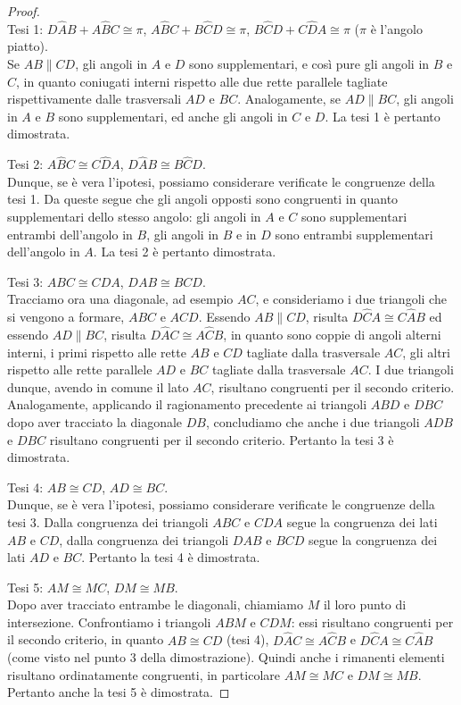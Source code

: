 \begin{proof}~\\
\indent Tesi 1: $D\widehat{A}B+A\widehat{B}C\cong\pi$, $A\widehat{B}C+B\widehat{C}D\cong\pi$, $B\widehat{C}D+C\widehat{D}A\cong\pi$ ($\pi$ è l'angolo piatto).\\
Se $AB\parallel CD$, gli angoli in $A$ e $D$ sono supplementari, e così pure gli angoli in $B$ e $C$, in quanto coniugati interni rispetto alle due rette parallele tagliate rispettivamente dalle trasversali $AD$ e $BC$. Analogamente, se $AD\parallel BC$, gli angoli in $A$ e $B$ sono supplementari, ed anche gli angoli in $C$ e $D$. La tesi 1 è pertanto dimostrata.

Tesi 2: $A\widehat{B}C\cong C\widehat{D}A$, $D\widehat{A}B\cong B\widehat{C}D$.\\
Dunque, se è vera l'ipotesi, possiamo considerare verificate le congruenze della tesi 1. Da queste segue che gli angoli opposti sono congruenti in quanto supplementari dello stesso angolo: gli angoli in $A$ e $C$ sono supplementari entrambi dell'angolo in $B$, gli angoli in $B$ e in $D$ sono entrambi supplementari dell'angolo in $A$. La tesi 2 è pertanto dimostrata.

Tesi 3: $ABC\cong CDA$, $DAB\cong BCD$.\\
Tracciamo ora una diagonale, ad esempio $AC$, e consideriamo i due triangoli che si vengono a formare, $ABC$ e $ACD$. Essendo $AB\parallel CD$, risulta $D\widehat{C}A\cong C\widehat{A}B$ ed essendo $AD\parallel BC$, risulta $D\widehat{A}C\cong A\widehat{C}B$, in quanto sono coppie di angoli alterni interni, i primi rispetto alle rette $AB$ e $CD$ tagliate dalla trasversale $AC$, gli altri rispetto alle rette parallele $AD$ e $BC$ tagliate dalla trasversale $AC$. I due triangoli dunque, avendo in comune il lato $AC$, risultano congruenti per il secondo criterio. Analogamente, applicando il ragionamento precedente ai triangoli $ABD$ e $DBC$ dopo aver tracciato la diagonale $DB$, concludiamo che anche i due triangoli $ADB$ e $DBC$ risultano congruenti per il secondo criterio. Pertanto la tesi 3 è dimostrata.

Tesi 4: $AB\cong CD$, $AD\cong BC$.\\
Dunque, se è vera l'ipotesi, possiamo considerare verificate le congruenze della tesi 3. Dalla congruenza dei triangoli $ABC$ e $CDA$ segue la congruenza dei lati $AB$ e $CD$, dalla congruenza dei triangoli $DAB$ e $BCD$ segue la congruenza dei lati $AD$ e $BC$. Pertanto la tesi 4 è dimostrata.

Tesi 5: $AM\cong MC$, $DM\cong MB$.\\
Dopo aver tracciato entrambe le diagonali, chiamiamo $M$ il loro punto di intersezione. Confrontiamo i triangoli $ABM$ e $CDM$: essi risultano congruenti per il secondo criterio, in quanto $AB\cong CD$ (tesi 4), $D\widehat{A}C\cong A\widehat{C}B$ e $D\widehat{C}A\cong C\widehat{A}B$ (come visto nel punto 3 della dimostrazione). Quindi anche i rimanenti elementi risultano ordinatamente congruenti, in particolare $AM\cong MC$ e $DM\cong MB$. Pertanto anche la tesi 5 è dimostrata.
\end{proof}


